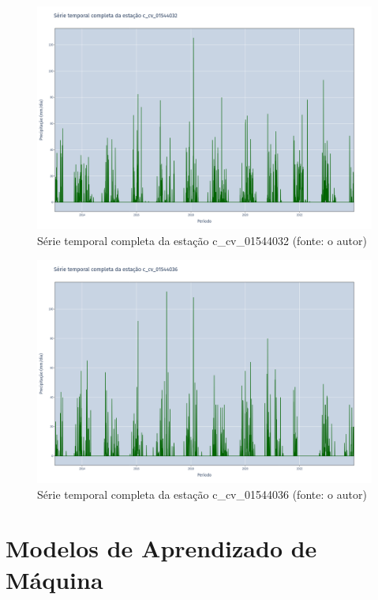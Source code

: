 \begin{figure}[!h]
\centering
\includegraphics[scale=0.25]{Figuras/rio_sao_francisco/franciscoSerieCompleta_c_cv_01544032.png}
\caption{Série temporal completa da estação c\_cv\_01544032 (fonte: o autor)}
\label{fig:franciscoSerieCompleta_c_cv_01544032}
\end{figure}

\begin{figure}[!h]
\centering
\includegraphics[scale=0.25]{Figuras/rio_sao_francisco/franciscoSerieCompleta_c_cv_01544036.png}
\caption{Série temporal completa da estação c\_cv\_01544036 (fonte: o autor)}
\label{fig:franciscoSerieCompleta_c_cv_01544036}
\end{figure}


\section{Modelos de Aprendizado de Máquina}


